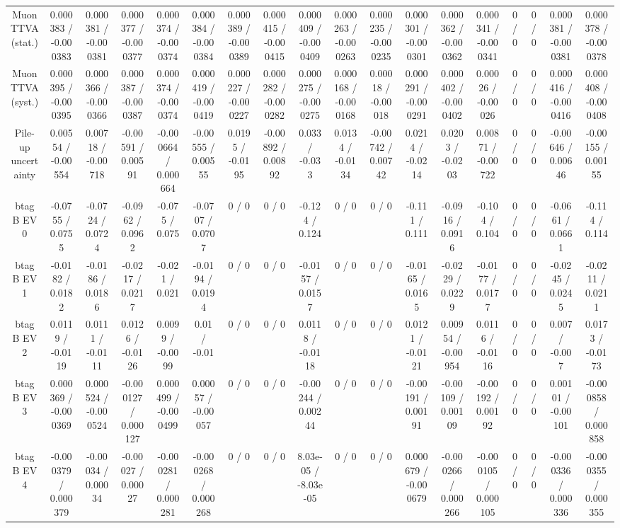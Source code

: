 \documentclass[10pt]{article}
\begin{document}
\begin{table}[htbp]
\begin{center}
\begin{tabular}{|c|c|c|c|c|c|c|c|c|c|c|c|c|c|c|c|c|c|}
  Muon TTVA (stat.) & 0.000383 / -0.000383 & 0.000381 / -0.000381 & 0.000377 / -0.000377 & 0.000374 / -0.000374 & 0.000384 / -0.000384 & 0.000389 / -0.000389 & 0.000415 / -0.000415 & 0.000409 / -0.000409 & 0.000263 / -0.000263 & 0.000235 / -0.000235 & 0.000301 / -0.000301 & 0.000362 / -0.000362 & 0.000341 / -0.000341 & 0 / 0 & 0 / 0 & 0.000381 / -0.000381 & 0.000378 / -0.000378 \\ 
  Muon TTVA (syst.) & 0.000395 / -0.000395 & 0.000366 / -0.000366 & 0.000387 / -0.000387 & 0.000374 / -0.000374 & 0.000419 / -0.000419 & 0.000227 / -0.000227 & 0.000282 / -0.000282 & 0.000275 / -0.000275 & 0.000168 / -0.000168 & 0.00018 / -0.00018 & 0.000291 / -0.000291 & 0.000402 / -0.000402 & 0.00026 / -0.00026 & 0 / 0 & 0 / 0 & 0.000416 / -0.000416 & 0.000408 / -0.000408 \\ 
  Pile-up uncertainty & 0.00554 / -0.00554 & 0.00718 / -0.00718 & -0.00591 / 0.00591 & -0.000664 / 0.000664 & -0.00555 / 0.00555 & 0.0195 / -0.0195 & -0.00892 / 0.00892 & 0.033 / -0.033 & 0.0134 / -0.0134 & -0.00742 / 0.00742 & 0.0214 / -0.0214 & 0.0203 / -0.0203 & 0.00871 / -0.00722 & 0 / 0 & 0 / 0 & -0.00646 / 0.00646 & -0.00155 / 0.00155 \\ 
  btag B EV 0 & -0.0755 / 0.0755 & -0.0724 / 0.0724 & -0.0962 / 0.0962 & -0.075 / 0.075 & -0.0707 / 0.0707 & 0 / 0 & 0 / 0 & -0.124 / 0.124 & 0 / 0 & 0 / 0 & -0.111 / 0.111 & -0.0916 / 0.0916 & -0.104 / 0.104 & 0 / 0 & 0 / 0 & -0.0661 / 0.0661 & -0.114 / 0.114 \\ 
  btag B EV 1 & -0.0182 / 0.0182 & -0.0186 / 0.0186 & -0.0217 / 0.0217 & -0.021 / 0.021 & -0.0194 / 0.0194 & 0 / 0 & 0 / 0 & -0.0157 / 0.0157 & 0 / 0 & 0 / 0 & -0.0165 / 0.0165 & -0.0229 / 0.0229 & -0.0177 / 0.0177 & 0 / 0 & 0 / 0 & -0.0245 / 0.0245 & -0.0211 / 0.0211 \\ 
  btag B EV 2 & 0.0119 / -0.0119 & 0.0111 / -0.0111 & 0.0126 / -0.0126 & 0.0099 / -0.0099 & 0.01 / -0.01 & 0 / 0 & 0 / 0 & 0.0118 / -0.0118 & 0 / 0 & 0 / 0 & 0.0121 / -0.0121 & 0.00954 / -0.00954 & 0.0116 / -0.0116 & 0 / 0 & 0 / 0 & 0.007 / -0.007 & 0.0173 / -0.0173 \\ 
  btag B EV 3 & 0.000369 / -0.000369 & 0.000524 / -0.000524 & -0.000127 / 0.000127 & 0.000499 / -0.000499 & 0.00057 / -0.00057 & 0 / 0 & 0 / 0 & -0.00244 / 0.00244 & 0 / 0 & 0 / 0 & -0.00191 / 0.00191 & -0.00109 / 0.00109 & -0.00192 / 0.00192 & 0 / 0 & 0 / 0 & 0.00101 / -0.00101 & -0.000858 / 0.000858 \\ 
  btag B EV 4 & -0.000379 / 0.000379 & -0.00034 / 0.00034 & -0.00027 / 0.00027 & -0.000281 / 0.000281 & -0.000268 / 0.000268 & 0 / 0 & 0 / 0 & 8.03e-05 / -8.03e-05 & 0 / 0 & 0 / 0 & 0.000679 / -0.000679 & -0.000266 / 0.000266 & -0.000105 / 0.000105 & 0 / 0 & 0 / 0 & -0.000336 / 0.000336 & -0.000355 / 0.000355 \\ 

\end{tabular}
\end{center}
\end{table}
\end{document}
